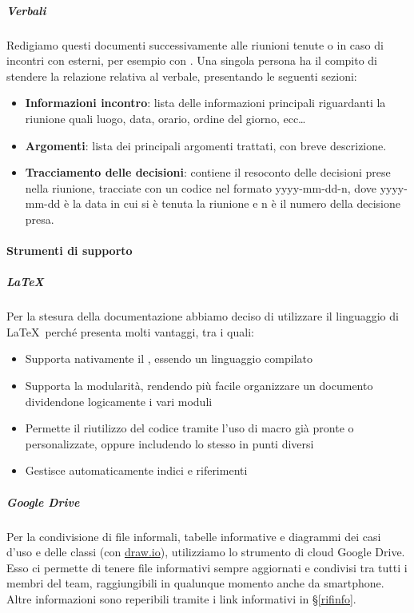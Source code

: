             \subparagraph{Verbali}\label{Verbali}
			Redigiamo questi documenti successivamente alle riunioni tenute	o in caso di incontri con  esterni, per esempio con \II. Una singola persona ha il compito di stendere
			la relazione relativa al verbale, presentando le seguenti sezioni:
			\begin{itemize}
				\item \textbf{Informazioni incontro}: lista delle informazioni principali riguardanti la riunione quali luogo, data, orario, ordine del giorno, ecc\dots
				\item \textbf{Argomenti}: lista dei principali argomenti trattati, con breve descrizione.
				\item \textbf{Tracciamento delle decisioni}: contiene il resoconto delle decisioni prese nella riunione, tracciate con un codice nel formato yyyy-mm-dd-n, dove yyyy-mm-dd è la data in cui si è tenuta la riunione e n è il numero della decisione presa.
				
			\end{itemize}


			\paragraph{Strumenti di supporto}\label{StrumentiDiSupporto}

			\subparagraph{\LaTeX}\label{LaTeX}
			Per la stesura della documentazione abbiamo deciso di utilizzare il linguaggio di  \LaTeX\ perché presenta molti vantaggi, tra i quali:
			\begin{itemize}
				\item Supporta nativamente il , essendo un linguaggio compilato
				\item Supporta la modularità, rendendo più facile organizzare un documento dividendone logicamente i vari moduli
				\item Permette il riutilizzo del codice tramite l'uso di macro già pronte o personalizzate, oppure includendo lo stesso  in punti diversi
				\item Gestisce automaticamente indici e riferimenti
			\end{itemize}

			\subparagraph{Google Drive}\label{GoogleDrive}
			Per la condivisione di file informali, tabelle informative e diagrammi dei casi d'uso e delle classi (con \hyperref[drawio]{draw.io}), utilizziamo lo strumento
			di cloud Google Drive. Esso ci permette di tenere file informativi sempre aggiornati e condivisi tra tutti i membri del team, raggiungibili in qualunque momento
			anche da smartphone. Altre informazioni sono reperibili tramite i link informativi in \S\ref{rifinfo}.

